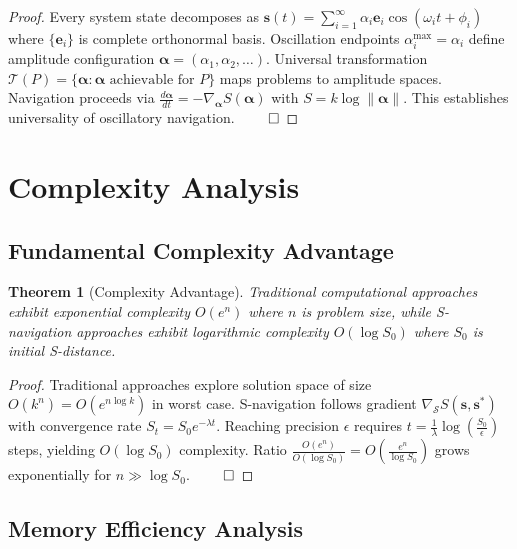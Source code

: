\documentclass[11pt]{article}
\newtheorem{theorem}{Theorem}
\begin{document}
\begin{proof}
Every system state decomposes as $\mathbf{s}(t) = \sum_{i=1}^{\infty} \alpha_i \mathbf{e}_i \cos(\omega_i t + \phi_i)$ where $\{\mathbf{e}_i\}$ is complete orthonormal basis. Oscillation endpoints $\alpha_i^{\max} = \alpha_i$ define amplitude configuration $\boldsymbol{\alpha} = (\alpha_1, \alpha_2, \ldots)$. Universal transformation $\mathcal{T}(P) = \{\boldsymbol{\alpha} : \boldsymbol{\alpha} \text{ achievable for } P\}$ maps problems to amplitude spaces. Navigation proceeds via $\frac{d\boldsymbol{\alpha}}{dt} = -\nabla_{\boldsymbol{\alpha}} S(\boldsymbol{\alpha})$ with $S = k \log \|\boldsymbol{\alpha}\|$. This establishes universality of oscillatory navigation. $\qed$
\end{proof}

\section{Complexity Analysis}

\subsection{Fundamental Complexity Advantage}

\begin{theorem}[Complexity Advantage]
Traditional computational approaches exhibit exponential complexity $O(e^n)$ where $n$ is problem size, while S-navigation approaches exhibit logarithmic complexity $O(\log S_0)$ where $S_0$ is initial S-distance.
\end{theorem}

\begin{proof}
Traditional approaches explore solution space of size $O(k^n) = O(e^{n \log k})$ in worst case. S-navigation follows gradient $\nabla_{\mathcal{S}} S(\mathbf{s}, \mathbf{s}^*)$ with convergence rate $S_t = S_0 e^{-\lambda t}$. Reaching precision $\epsilon$ requires $t = \frac{1}{\lambda} \log(\frac{S_0}{\epsilon})$ steps, yielding $O(\log S_0)$ complexity. Ratio $\frac{O(e^n)}{O(\log S_0)} = O(\frac{e^n}{\log S_0})$ grows exponentially for $n \gg \log S_0$. $\qed$
\end{proof}

\subsection{Memory Efficiency Analysis}
\end{document}
